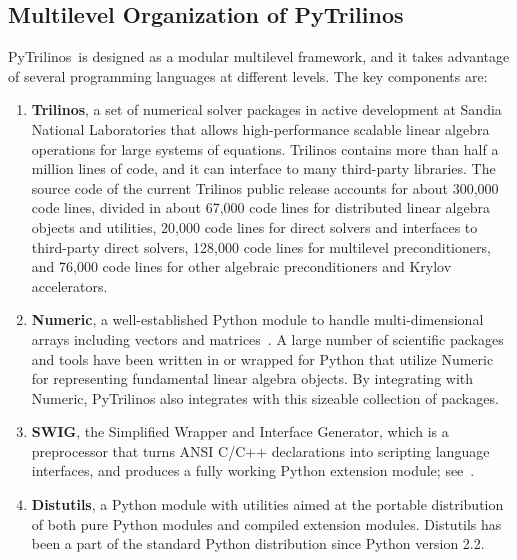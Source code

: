 \documentclass[acmtocl]{acmtrans2m}
\newcommand{\PyTrilinos}{{PyTrilinos}}
\begin{document}
\subsection{Multilevel Organization of PyTrilinos}
\label{sec:multilevel}

\PyTrilinos\ is designed as a modular multilevel framework, and it
takes advantage of several programming languages at different levels.
The key components are:

\begin{enumerate}

\item {\bf Trilinos}, a set of numerical solver packages in active
  development at Sandia National Laboratories that allows
  high-performance scalable linear algebra operations for large
  systems of equations. Trilinos contains more than half a million
  lines of code, and it can interface to many third-party
  libraries. The source code of the current Trilinos public release
  accounts for about 300,000 code lines, divided in about 67,000 code
  lines for distributed linear algebra objects and utilities, 20,000
  code lines for direct solvers and interfaces to third-party direct
  solvers, 128,000 code lines for multilevel preconditioners, and
  76,000 code lines for other algebraic preconditioners and Krylov
  accelerators.

\item {\bf Numeric}, a well-established Python module to handle
  multi-dimensional arrays including vectors and
  matrices~\cite{numeric}.  A large number of scientific packages and
  tools have been written in or wrapped for Python that utilize
  Numeric for representing fundamental linear algebra objects.  By
  integrating with Numeric, PyTrilinos also integrates with this
  sizeable collection of packages.

\item {\bf SWIG}, the Simplified Wrapper and Interface Generator,
  which is a preprocessor that turns ANSI C/C++ declarations into
  scripting language interfaces, and produces a fully working Python
  extension module; see~\cite{swig}.

\item {\bf Distutils}, a Python module with utilities aimed at the
  portable distribution of both pure Python modules and compiled
  extension modules.  Distutils has been a part of the standard Python
  distribution since Python version 2.2.

\end{enumerate}
\end{document}
